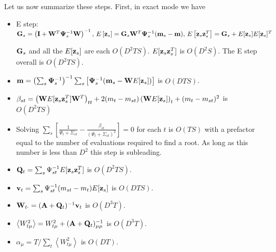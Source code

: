 \documentclass[nofootinbib,amssymb,amsmath]{revtex4}
\newcommand{\ave}[1]{\left\langle #1 \right\rangle}
\newcommand{\vI}{{\bf I}}
\newcommand{\vv}{{\bf v}}
\newcommand{\vz}{{\bf z}}
\newcommand{\vm}{{\bf m}}
\newcommand{\vG}{{\bf G}}
\newcommand{\vQ}{{\bf Q}}
\newcommand{\vW}{{\bf W}}
\newcommand{\vPsi}{{\bf \Psi}}
\newcommand{\vA}{{\bf A}}
\begin{document}
Let us now summarize these steps.  First, in exact mode we have
\begin{itemize}
\item E step: $\vG_s = \left( \vI + \vW^T \vPsi_s^{-1} \vW \right)^{-1}, \,
E \left[ \vz_s \right] = \vG_s \vW^T \vPsi_s^{-1} (\vm_s - \vm), \,
E \left[ \vz_s \vz_s^T \right] = \vG_s + E[\vz_s] E[\vz_s]^T$

$\vG_s$ and all the $E[\vz_s]$ are each $O(D^2 T S)$.  $E[\vz_s \vz_s^T]$ is $O(D^2 S)$.  The E step overall is $O(D^2 T S)$.

\item $\vm = \left( \sum_s \vPsi_{s}^{-1} \right)^{-1} \sum_s \left[ \vPsi_{s}^{-1}  (\vm_{s}  - \vW  E[\vz_{s}] ) \right]$ is $O(D T S)$.

\item  $ \beta_{st} =\left( \vW E[\vz_s \vz_s^T] \vW^T \right)_{tt} +2 (m_t - m_{st}) \left( \vW E[\vz_s] \right)_t + (m_t - m_{st})^2$ is $O(D^2 T S)$

\item Solving $\sum_s \left[ \frac{1}{\Psi_t + \Sigma_{st}} - \frac{\beta_{st}}{(\Psi_t + \Sigma_{st})^2} \right] = 0$ for each $t$ is $O(T S)$ with a prefactor equal to the number of evaluations required to find a root.  As long as this number is less than $D^2$ this step is subleading.

\item $\vQ_t = \sum_s \Psi_{st}^{-1} E[\vz_s \vz_s^T]$ is $O(D^2 T S)$.

\item $\vv_t = \sum_s \Psi_{st}^{-1} (m_{st} - m_t)E[\vz_s ]$ is $O(D T S)$.

\item $ \vW_{t \cdot} = (\vA + \vQ_t)^{-1} \vv_t$ is $O(D^3 T)$.

\item $\ave{W_{t\mu}^2} = W_{t\mu}^2 + (\vA + \vQ_t)^{-1}_{\mu\mu}$ is $O(D^3 T)$.

\item $\alpha_\mu = T / \sum_t \ave{W_{t\mu}^2}$ is $O(D T)$.

\end{itemize}
\end{document}
